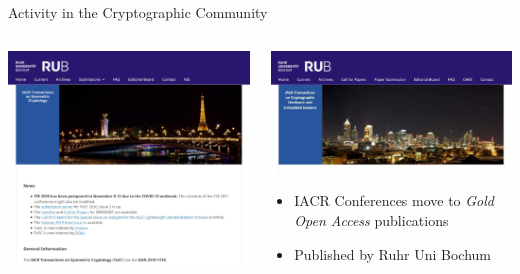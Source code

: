 \documentclass[%
    10pt,
    professionalfont,
    aspectratio=169,
    xcolor=dvipsnames, 
]{beamer}
\begin{document}
\begin{frame}{Activity in the Cryptographic Community}
    \begin{columns}
        \begin{column}{0.45\textwidth}
            \centering
            \includegraphics[width=\textwidth]{data/tosc.jpg}
        \end{column}
        \begin{column}{0.45\textwidth}
            \centering
            \vspace{-19pt}
            \includegraphics[width=\textwidth]{data/tches.jpg}
            \begin{itemize}
                \item IACR Conferences move to \emph{Gold Open Access} publications
                \item Published by Ruhr Uni Bochum
            \end{itemize}
        \end{column}
    \end{columns}
    \vspace{5pt}
\end{frame}
\end{document}
